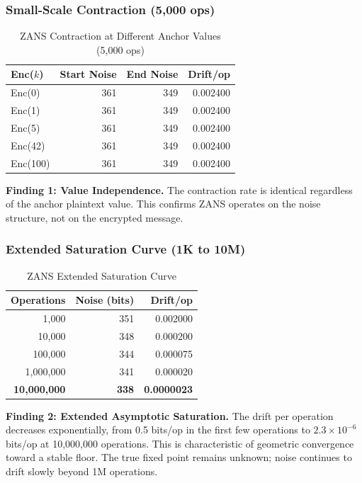 \documentclass[11pt]{article}
\begin{document}
\subsubsection{Small-Scale Contraction (5,000 ops)}

\begin{table}[h]
\centering
\caption{ZANS Contraction at Different Anchor Values (5,000 ops)}
\begin{tabular}{l|r|r|r}
\textbf{Enc($k$)} & \textbf{Start Noise} & \textbf{End Noise} & \textbf{Drift/op} \\
\hline
Enc(0) & 361 & 349 & 0.002400 \\
Enc(1) & 361 & 349 & 0.002400 \\
Enc(5) & 361 & 349 & 0.002400 \\
Enc(42) & 361 & 349 & 0.002400 \\
Enc(100) & 361 & 349 & 0.002400
\end{tabular}
\end{table}

\textbf{Finding 1: Value Independence.} The contraction rate is identical regardless of the anchor plaintext value. This confirms ZANS operates on the noise structure, not on the encrypted message.

\subsubsection{Extended Saturation Curve (1K to 10M)}

\begin{table}[h]
\centering
\caption{ZANS Extended Saturation Curve}
\begin{tabular}{r|r|r}
\textbf{Operations} & \textbf{Noise (bits)} & \textbf{Drift/op} \\
\hline
1,000 & 351 & 0.002000 \\
10,000 & 348 & 0.000200 \\
100,000 & 344 & 0.000075 \\
1,000,000 & 341 & 0.000020 \\
\textbf{10,000,000} & \textbf{338} & \textbf{0.0000023}
\end{tabular}
\end{table}

\textbf{Finding 2: Extended Asymptotic Saturation.} The drift per operation decreases exponentially, from 0.5 bits/op in the first few operations to $2.3 \times 10^{-6}$ bits/op at 10,000,000 operations. This is characteristic of geometric convergence toward a stable floor. The true fixed point remains unknown; noise continues to drift slowly beyond 1M operations.
\end{document}

